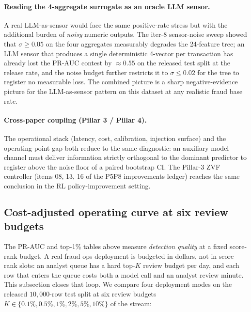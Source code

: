 \paragraph{Reading the 4-aggregate surrogate as an oracle LLM sensor.}
A real LLM-as-sensor would face the same positive-rate stress but with
the additional burden of \emph{noisy} numeric outputs. The iter-8
sensor-noise sweep showed that $\sigma \ge 0.05$ on the four
aggregates measurably degrades the 24-feature tree; an LLM sensor that
produces a single deterministic 4-vector per transaction has already
lost the PR-AUC contest by $\approx 0.55$ on the released test split at
the release rate, and the noise budget further restricts it to
$\sigma \le 0.02$ for the tree to register no measurable loss. The
combined picture is a sharp negative-evidence picture for the
LLM-as-sensor pattern on this dataset at any realistic fraud base
rate.

\paragraph{Cross-paper coupling (Pillar 3 / Pillar 4).} The
 operational stack (latency, cost, calibration,
injection surface) and the 
operating-point gap both reduce to the same diagnostic: an auxiliary
model channel must deliver information strictly orthogonal to the
dominant predictor to register above the noise floor of a paired
bootstrap CI. The Pillar-3 ZVF controller (items 08, 13, 16 of the
P5P8 improvements ledger) reaches the same conclusion in the
RL policy-improvement setting.

\subsection{Cost-adjusted operating curve at six review budgets}
\label{sec:p8-evidence-cost-curve}

The PR-AUC and top-1\% tables above measure \emph{detection quality}
at a fixed score-rank budget. A real fraud-ops deployment is budgeted
in dollars, not in score-rank slots: an analyst queue has a hard
top-$K$ review budget per day, and each row that enters the queue
costs both a model call and an analyst review minute. This subsection
closes that loop. We compare four deployment modes on the released
$10{,}000$-row test split at six review budgets $K \in \{0.1\%, 0.5\%,
1\%, 2\%, 5\%, 10\%\}$ of the stream:

